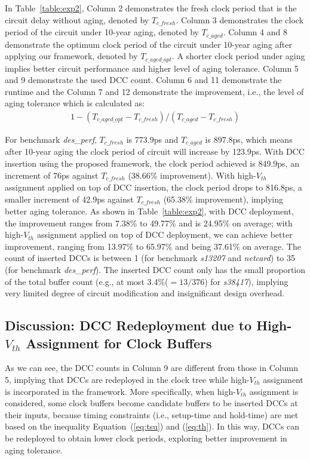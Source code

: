 In Table~\ref{table:exp2}, Column 2  demonstrates the fresh clock period that is the circuit delay without aging, denoted by $T_{c\_fresh}$. Column 3 demonstrates the clock period of the circuit under 10-year aging, denoted by $T_{c\_aged}$. Column 4 and 8 demonstrate the optimum clock period of the circuit under 10-year aging after applying our framework, denoted by $T_{c\_aged\_opt}$. A shorter clock period under aging implies better circuit performance and higher level of aging tolerance. Column 5 and 9 demonstrate the used DCC count. Column 6 and 11 demonstrate the runtime and the Column 7 and 12 demonstrate the improvement, i.e., the level of aging tolerance which is calculated as:
\begin{gather*}
1 - (T_{c\_aged\_opt} - T_{c\_fresh}) / (T_{c\_aged} - T_{c\_fresh})
\end{gather*}

For benchmark \textit{des\_perf}, $T_{c\_fresh}$ is 773.9ps and $T_{c\_aged}$ is 897.8ps, which means after 10-year aging the clock period of circuit will increase by 123.9ps. With DCC insertion using the proposed framework, the clock period achieved is 849.9ps, an increment of 76ps against $T_{c\_fresh}$ (38.66\% improvement). With high-$V_{th}$ assignment applied on top of DCC insertion, the clock period drops to 816.8ps, a smaller increment of 42.9ps against $T_{c\_fresh}$ (65.38\% improvement), implying better aging tolerance. As shown in Table~\ref{table:exp2}, with DCC deployment, the improvement ranges from 7.38\% to 49.77\% and is 24.95\% on average; with high-$V_{th}$ assignment applied on top of DCC deployment, we can achieve better improvement, ranging from 13.97\% to 65.97\% and being 37.61\% on average. The count of inserted DCCs is between 1 (for benchmark \textit{s13207} and \textit{netcard}) to 35 (for benchmark \textit{des\_perf}). The inserted DCC count only has the small proportion of the total buffer count (e.g., at most 3.4\%($= 13/376$) for \textit{s38417}), implying very limited degree of circuit modification and insignificant design overhead. %

\subsection{Discussion: DCC Redeployment due to High-$V_{th}$ Assignment for Clock Buffers}
As we can see, the DCC counts in Column 9 are different from those in Column 5, implying that DCCs are redeployed in the clock tree while high-$V_{th}$ assignment is incorporated in the framework. More specifically, when high-$V_{th}$ assignment is considered, some clock buffers become candidate buffers to be inserted DCCs at their inputs, because timing constraints (i.e., setup-time and hold-time) are met based on the inequality Equation~(\ref{eq:tsu}) and (\ref{eq:th}). In this way, DCCs can be redeployed to obtain lower clock periods, exploring better improvement in aging tolerance.


